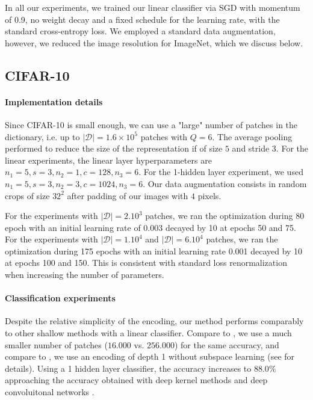 \documentclass{article}
\begin{document}
{In all our experiments, we trained our linear classifier via SGD with momentum of 0.9, no weight decay and a fixed schedule for the learning rate, with the standard cross-entropy loss. We employed a standard data augmentation, however, we reduced the image resolution for ImageNet, which we discuss below.



\subsection{CIFAR-10}

 \paragraph{Implementation details}Since CIFAR-10 is small enough, we can use a "large" number of patches in the dictionary, i.e. up to $|\mathcal{D}|=1.6\times10^5$ patches with $Q = 6$.
The average pooling performed to reduce the size of the representation if of size $5$ and stride $3$. For the linear experiments, the linear layer hyperparameters are  $n_1=5,s=3, n_2=1, c=128, n_3=6$.
For the 1-hidden layer experiment, we used $n_1=5, s=3, n_2=3,c=1024, n_3=6$.
Our data augmentation consists in random crops of size $32^2$ after  padding of our images with $4$ pixels.

For the experiments with $|\mathcal{D}|=2. 10^3$ patches, we ran the optimization during 80 epoch with an initial learning rate of 0.003 decayed by 10 at epochs 50 and 75.
For the experiments with $|\mathcal{D}|=1.10^4$ and $|\mathcal{D}|=6. 10^4$ patches, we ran the optimization during 175 epochs with an initial learning rate 0.001 decayed by 10 at epochs 100 and  150. This is consistent with standard loss renormalization when increasing the number of parameters.


\paragraph{Classification experiments} Despite the relative simplicity of the encoding, our method performs comparably to other shallow methods with a linear classifier.
Compare to \cite{recht2019imagenet},  we use a much smaller number of patches ($16.000$ vs. $256.000$) for the same accuracy, and compare to \cite{mairal2016end}, we use an encoding of depth 1 without subspace learning (see \cite{mairal2016end} for details).
Using a 1 hidden layer classifier, the accuracy increases to $88.0 \%$ approaching the accuracy obtained with deep kernel methods \citep{li2019enhanced,shankar2020neural} and deep convoluitonal networks \citep{krizhevsky2012imagenet}.



}
\end{document}
